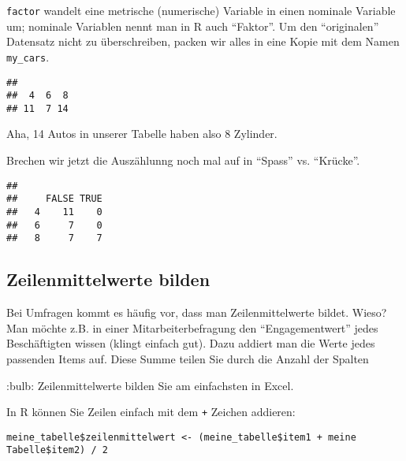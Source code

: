 \documentclass[]{article}
\newenvironment{Shaded}{\begin{snugshade}}{\end{snugshade}}
\newcommand{\KeywordTok}[1]{\textcolor[rgb]{0.13,0.29,0.53}{\textbf{#1}}}
\newcommand{\NormalTok}[1]{#1}
\newcommand{\OperatorTok}[1]{\textcolor[rgb]{0.81,0.36,0.00}{\textbf{#1}}}
\begin{document}
\texttt{factor} wandelt eine metrische (numerische) Variable in einen
nominale Variable um; nominale Variablen nennt man in R auch ``Faktor''.
Um den ``originalen'' Datensatz nicht zu überschreiben, packen wir alles
in eine Kopie mit dem Namen \texttt{my\_cars}.

\begin{Shaded}
\end{Shaded}

\begin{verbatim}
## 
##  4  6  8 
## 11  7 14
\end{verbatim}

Aha, 14 Autos in unserer Tabelle haben also 8 Zylinder.

Brechen wir jetzt die Auszählunng noch mal auf in ``Spass'' vs.
``Krücke''.

\begin{Shaded}
\end{Shaded}

\begin{verbatim}
##    
##     FALSE TRUE
##   4    11    0
##   6     7    0
##   8     7    7
\end{verbatim}

\hypertarget{zeilenmittelwerte-bilden}{%
\subsection{Zeilenmittelwerte bilden}\label{zeilenmittelwerte-bilden}}

Bei Umfragen kommt es häufig vor, dass man Zeilenmittelwerte bildet.
Wieso? Man möchte z.B. in einer Mitarbeiterbefragung den
``Engagementwert'' jedes Beschäftigten wissen (klingt einfach gut). Dazu
addiert man die Werte jedes passenden Items auf. Diese Summe teilen Sie
durch die Anzahl der Spalten

:bulb: Zeilenmittelwerte bilden Sie am einfachsten in Excel.

In R können Sie Zeilen einfach mit dem \texttt{+} Zeichen addieren:

\begin{verbatim}
meine_tabelle$zeilenmittelwert <- (meine_tabelle$item1 + meine Tabelle$item2) / 2
\end{verbatim}
\end{document}
